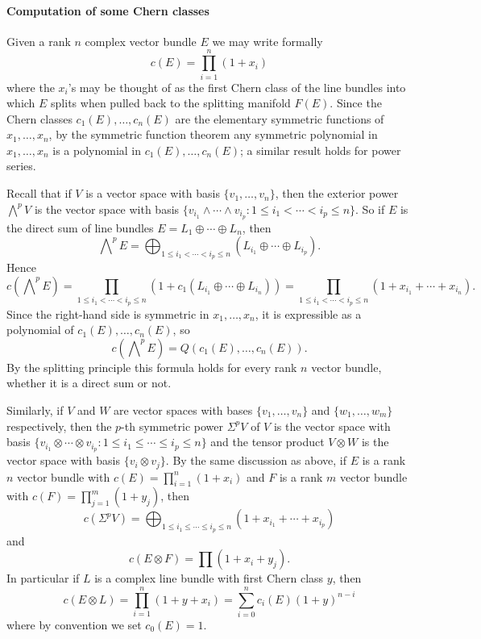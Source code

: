 \paragraph{Computation of some Chern classes}
Given a rank $n$ complex vector bundle $E$ we may write formally
\[c(E)=\prod_{i=1}^{n}(1+x_i)\]
where the $x_i$'s may be thought of as the first Chern class of the line bundles into which $E$ splits when pulled back to the splitting manifold $F(E)$. Since the 
Chern classes $c_1(E),\dots,c_n(E)$ are the elementary symmetric functions of $x_1,\dots,x_n$, by the symmetric function theorem any symmetric polynomial in $x_1,\dots,x_n$ 
is a polynomial in $c_1(E),\dots,c_n(E)$; a similar result holds for power series.
\begin{example}
Recall that if $V$ is a vector space with basis $\{v_1,\dots,v_n\}$, then the exterior power $\bigwedge^pV$ is the vector space with basis 
$\{v_{i_1}\wedge\cdots \wedge v_{i_p}:1\leq i_1<\cdots<i_p\leq n\}$. So if $E$ is the direct sum of line bundles $E=L_1\oplus\cdots\oplus L_n$, then
\[\bigwedge\nolimits^pE=\bigoplus_{1\leq i_1<\cdots<i_p\leq n}(L_{i_1}\oplus\cdots\oplus L_{i_p}).\]
Hence
\[c(\bigwedge\nolimits^pE)=\prod_{1\leq i_1<\cdots<i_p\leq n}(1+c_1(L_{i_1}\oplus\cdots\oplus L_{i_n}))=\prod_{1\leq i_1<\cdots<i_p\leq n}(1+x_{i_1}+\cdots+x_{i_n}).\]
Since the right-hand side is symmetric in $x_1,\dots,x_n$, it is expressible as a polynomial of $c_1(E),\dots,c_n(E)$, so
\[c(\bigwedge\nolimits^pE)=Q(c_1(E),\dots,c_n(E)).\]
By the splitting principle this formula holds for every rank $n$ vector bundle, whether it is a direct sum or not.\par
Similarly, if $V$ and $W$ are vector spaces with bases $\{v_1,\dots,v_n\}$ and $\{w_1,\dots,w_m\}$ respectively, then the $p$-th symmetric power $\Sigma^pV$ of $V$ is 
the vector space with basis $\{v_{i_1}\otimes\cdots\otimes v_{i_p}:1\leq i_1\leq\cdots\leq i_p\leq n\}$ and the tensor product $V\otimes W$ is the vector space with 
basis $\{v_i\otimes v_j\}$. By the same discussion as above, if $E$ is a rank $n$ vector bundle with $c(E)=\prod_{i=1}^{n}(1+x_i)$ and $F$ is a rank $m$ vector bundle 
with $c(F)=\prod_{j=1}^{m}(1+y_j)$, then
\[c(\Sigma^pV)=\bigoplus_{1\leq i_1\leq\cdots\leq i_p\leq n}(1+x_{i_1}+\cdots+x_{i_p})\]
and
\[c(E\otimes F)=\prod(1+x_i+y_j).\]
In particular if $L$ is a complex line bundle with first Chern class $y$, then
\[c(E\otimes L)=\prod_{i=1}^{n}(1+y+x_i)=\sum_{i=0}^{n}c_i(E)(1+y)^{n-i}\]
where by convention we set $c_0(E)=1$.
\end{example}
